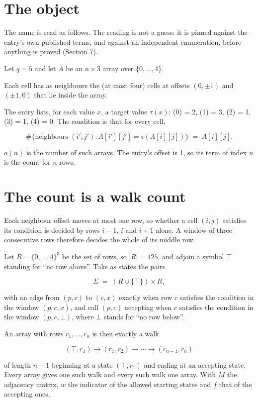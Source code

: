 \documentclass[11pt]{article}
\theoremstyle{definition}
\begin{document}
\section{The object}

The name is read as follows. The reading is not a guess: it is pinned against the entry's own published terms, and against an independent enumeration, before anything is proved (Section 7).

Let $q = 5$ and let $A$ be an $n \times 3$ array over $\{0,\dots,4\}$.

Each cell has as neighbours the (at most four) cells at offsets $(0,\pm1)$ and $(\pm1,0)$ that lie inside the array.

The entry lists, for each value $x$, a target value $\tau(x)$: \tau(0) = 2, \tau(1) = 3, \tau(2) = 1, \tau(3) = 1, \tau(4) = 0. The condition is that for every cell,

\[\#\{\text{neighbours } (i',j') : A[i'][j'] = \tau(A[i][j])\} \;=\; A[i][j].\]

$a(n)$ is the number of such arrays. The entry's offset is 1, so its term of index $n$ is the count for $n$ rows.

\section{The count is a walk count}

Each neighbour offset moves at most one row, so whether a cell $(i,j)$ satisfies its condition is decided by rows $i-1$, $i$ and $i+1$ alone. A window of three consecutive rows therefore decides the whole of its middle row.

Let $R = \{0,\dots,4\}^{3}$ be the set of rows, so $|R| = 125$, and adjoin a symbol $\top$ standing for ``no row above''. Take as states the pairs

\[\Sigma \;=\; (R \cup \{\top\}) \times R,\]

with an edge from $(p,c)$ to $(c,x)$ exactly when row $c$ satisfies the condition in the window $(p,c,x)$, and call $(p,c)$ accepting when $c$ satisfies the condition in the window $(p,c,\bot)$, where $\bot$ stands for ``no row below''.

An array with rows $r_1,\dots,r_n$ is then exactly a walk

\[(\top,r_1) \to (r_1,r_2) \to \cdots \to (r_{n-1},r_n)\]

of length $n-1$ beginning at a state $(\top,r_1)$ and ending at an accepting state. Every array gives one such walk and every such walk one array. With $M$ the adjacency matrix, $w$ the indicator of the allowed starting states and $f$ that of the accepting ones,
\end{document}
